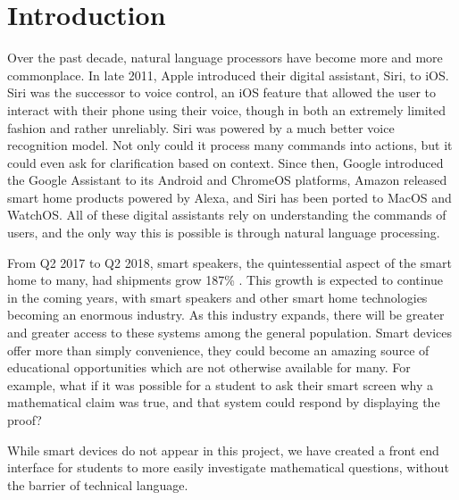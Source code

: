 \chapter{Introduction}\label{intro}
Over the past decade, natural language processors have become more and more commonplace. In late 2011, Apple introduced their digital assistant, Siri, to iOS. Siri was the successor to voice control, an iOS feature that allowed the user to interact with their phone using their voice, though in both an extremely limited fashion and rather unreliably. Siri was powered by a much better voice recognition model. Not only could it process many commands into actions, but it could even ask for clarification based on context. Since then, Google introduced the Google Assistant to its Android and ChromeOS platforms, Amazon released smart home products powered by Alexa, and Siri has been ported to MacOS and WatchOS. All of these digital assistants rely on understanding the commands of users, and the only way this is possible is through natural language processing.                                                                                 
                                                                                                           
From Q2 2017 to Q2 2018, smart speakers, the quintessential aspect of the smart home to many, had shipments grow 187\% \cite{canalys}. This growth is expected to continue in the coming years, with smart speakers and other smart home technologies becoming an enormous industry. As this industry expands, there will be greater and greater access to these systems among the general population. Smart devices offer more than simply convenience, they could become an amazing source of educational opportunities which are not otherwise available for many. For example, what if it was possible for a student to ask their smart screen why a mathematical claim was true, and that system could respond by displaying the proof?                                                 
                                                                                                           
While smart devices do not appear in this project, we have created a front end interface for students to 
more easily investigate mathematical questions, without the barrier of technical language.               
                                                                                                           
